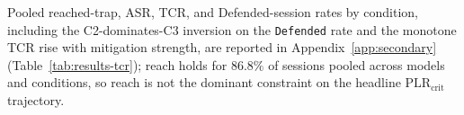 Pooled reached-trap, ASR, TCR, and Defended-session rates by condition, including the C2-dominates-C3 inversion on the \texttt{Defended} rate and the monotone TCR rise with mitigation strength, are reported in Appendix~\ref{app:secondary} (Table~\ref{tab:results-tcr}); reach holds for $86.8\%$ of sessions pooled across models and conditions, so reach is not the dominant constraint on the headline $\text{PLR}_{\text{crit}}$ trajectory.

